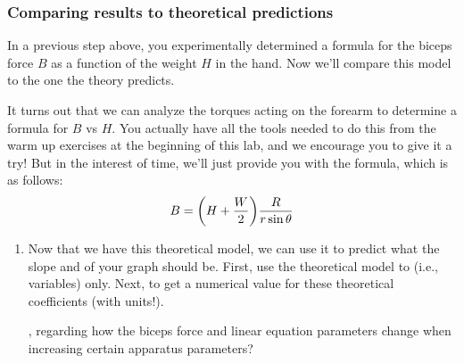 \subsubsection*{Comparing results to theoretical predictions}

In a previous step above,
you experimentally determined a formula for the biceps force $B$ as a function
of the weight $H$ in the hand.  
Now we'll compare this model to the one the theory predicts.

It turns out that we can analyze the torques acting on the forearm
to determine a formula for $B$ vs $H$.  You actually have all the tools needed
to do this from the warm up exercises at the beginning of this lab, and we
encourage you to give it a try!  But in the interest of time, we'll just
provide you with the formula, which is as follows:
\begin{equation*}
	B = {\left(  H + \frac{W}{2}  \right)}\frac{R}{r\sin\theta}
\end{equation*}


\begin{enumerate}[labproc]

\item
Now that we have this theoretical model, 
we can use it to predict what the slope and \yint of your graph should be.
First, use the theoretical model to 
 (i.e., variables) only.
Next, 
to get a numerical value for these theoretical coefficients (with units!).

,
regarding how the biceps force and linear equation parameters change when
increasing certain apparatus parameters?

\end{enumerate}


\temp{\pagebreak}
